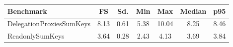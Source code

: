 \begin{center}
\begin{tabular}{l c c c c c c}
\toprule
\textbf{Benchmark} & \textbf{FS} & \textbf{Sd.} & \textbf{Min} & \textbf{Max} & \textbf{Median} & \textbf{p95}\\
\toprule

DelegationProxiesSumKeys & 8.13 & 0.61 & 5.38 & 10.04 & 8.25 & 8.46 \\
\midrule

ReadonlySumKeys & 3.64 & 0.28 & 2.43 & 4.13 & 3.69 & 3.84 \\
\midrule

\end{tabular}
\end{center}